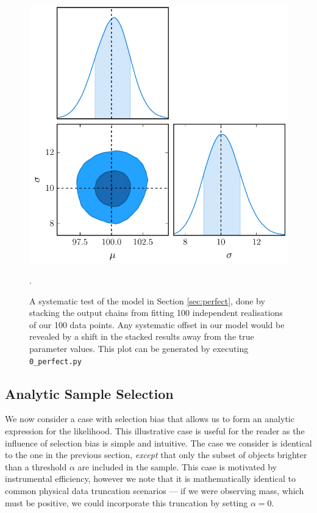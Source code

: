 \documentclass[a4paper,fleqn,usenatbib]{mnras}
\begin{document}
\begin{figure}
	\begin{center}
		\includegraphics[width=\columnwidth]{fig_0_perfect.pdf}
	\end{center}
	\caption{A systematic test of the model in Section \ref{sec:perfect}, done by stacking the output chains from fitting 100 independent realisations of our 100 data points. Any systematic offset in our model would be revealed by a shift in the stacked results away from the true parameter values. This plot can be generated by executing  \mbox{\texttt{0\_perfect.py}}}.
	\label{fig:perfect}
\end{figure}









\subsection{Analytic Sample Selection}
\label{sec:imperfect}

We now consider a case with selection bias that allows us to form an analytic expression for the likelihood.  This illustrative case is useful for the reader as the influence of selection bias is simple and intuitive. The case we consider is identical to the one in the previous section, \textit{except} that only the subset of objects brighter than a threshold $\alpha$ are included in the sample. This case is motivated by instrumental efficiency, however we note that it is mathematically identical to common physical data truncation scenarios --- if we were observing mass, which must be positive, we could incorporate this truncation by setting $\alpha = 0$.
\end{document}
